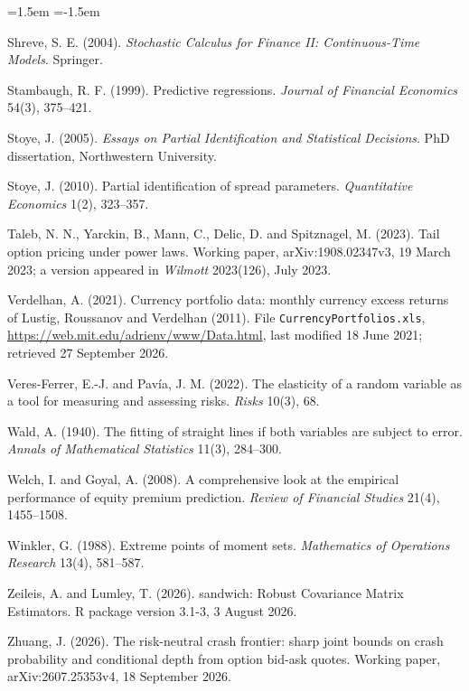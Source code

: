 \documentclass[11pt]{article}
\theoremstyle{result}
\begin{document}
\begin{list}{}{\leftmargin=1.5em \itemindent=-1.5em \itemsep=2pt \parsep=0pt}
\item Shreve, S. E. (2004). \emph{Stochastic Calculus for Finance II: Continuous-Time Models}. Springer.
\item Stambaugh, R. F. (1999). Predictive regressions. \emph{Journal of Financial Economics} 54(3), 375--421.
\item Stoye, J. (2005). \emph{Essays on Partial Identification and Statistical Decisions}. PhD dissertation, Northwestern University.
\item Stoye, J. (2010). Partial identification of spread parameters. \emph{Quantitative Economics} 1(2), 323--357.
\item Taleb, N. N., Yarckin, B., Mann, C., Delic, D. and Spitznagel, M. (2023). Tail option pricing under power laws. Working paper, arXiv:1908.02347v3, 19 March 2023; a version appeared in \emph{Wilmott} 2023(126), July 2023.
\item Verdelhan, A. (2021). Currency portfolio data: monthly currency excess returns of Lustig, Roussanov and Verdelhan (2011). File \texttt{CurrencyPortfolios.xls}, \url{https://web.mit.edu/adrienv/www/Data.html}, last modified 18 June 2021; retrieved 27 September 2026.
\item Veres-Ferrer, E.-J. and Pav\'ia, J. M. (2022). The elasticity of a random variable as a tool for measuring and assessing risks. \emph{Risks} 10(3), 68.
\item Wald, A. (1940). The fitting of straight lines if both variables are subject to error. \emph{Annals of Mathematical Statistics} 11(3), 284--300.
\item Welch, I. and Goyal, A. (2008). A comprehensive look at the empirical performance of equity premium prediction. \emph{Review of Financial Studies} 21(4), 1455--1508.
\item Winkler, G. (1988). Extreme points of moment sets. \emph{Mathematics of Operations Research} 13(4), 581--587.
\item Zeileis, A. and Lumley, T. (2026). sandwich: Robust Covariance Matrix Estimators. R package version 3.1-3, 3 August 2026.
\item Zhuang, J. (2026). The risk-neutral crash frontier: sharp joint bounds on crash probability and conditional depth from option bid-ask quotes. Working paper, arXiv:2607.25353v4, 18 September 2026.
\end{list}
\end{document}

